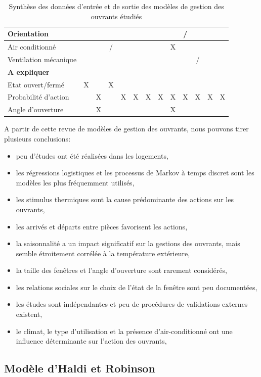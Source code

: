 \begin{table} [H]
\begin{tabular}{|l||c|c|c|c|c|c|c|c|c|c|c|c|}
\hline Orientation &  &  &  &  &  &  &  &  & / &  &  &  \\
\hline Air conditionné &  &  & / &  &  &  &  & X &  &  &  &  \\
\hline Ventilation mécanique &  &  &  &  &  &  &  &  &  & / &  &  \\
\hline \rowcolor{gray}\textbf{A expliquer} & \multicolumn{12}{c}{} \\
\hline Etat ouvert/fermé & X & & X & & & & & & & & &  \\
\hline Probabilité d'action &  & X & & X & X & X & X & X & X & X & X & X \\
\hline Angle d'ouverture &  & X &  &  &  &  &  & X &  &  &  &  \\
\hline
\end{tabular}
\caption{Synthèse des données d'entrée et de sortie des modèles de gestion des ouvrants étudiés}
\label{tab:WinInOut} 
\end{table}

A partir de cette revue de modèles de gestion des ouvrants, nous pouvons tirer plusieurs conclusions:
\begin{itemize}
\item peu d'études ont été réalisées dans les logements,
\item les régressions logistiques et les processus de Markov à temps discret sont les modèles les plus fréquemment utilisés,
\item les stimulus thermiques sont la cause prédominante des actions sur les ouvrants,
\item les arrivés et départs entre pièces favorisent les actions,
\item la saisonnalité a un impact significatif sur la gestions des ouvrants, mais semble étroitement corrélée à la température extérieure,
\item la taille des fenêtres et l'angle d'ouverture sont rarement considérés,
\item les relations sociales sur le choix de l'état de la fenêtre sont peu documentées,
\item les études sont indépendantes et peu de procédures de validations externes existent, 
\item le climat, le type d'utilisation et la présence d'air-conditionné ont une influence déterminante sur l'action des ouvrants,
\end{itemize}

\subsection{Modèle d'Haldi et Robinson}
\label{Modèle d'Haldi et Robinson}

